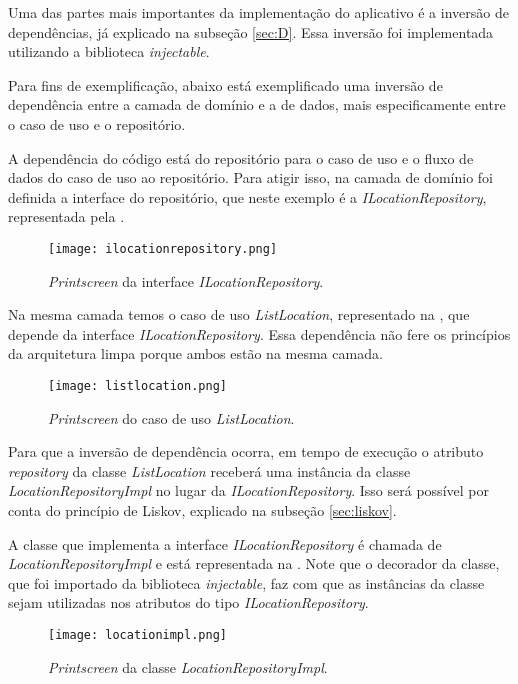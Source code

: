 Uma das partes mais importantes da implementação do aplicativo é a inversão de dependências, já explicado na subseção \ref{sec:D}. Essa inversão foi implementada utilizando a biblioteca \textit{injectable}.

Para fins de exemplificação, abaixo está exemplificado uma inversão de dependência entre a camada de domínio e a de dados, mais especificamente entre o caso de uso e o repositório.

A dependência do código está do repositório para o caso de uso e o fluxo de dados do caso de uso ao repositório. Para atigir isso, na camada de domínio foi definida a interface do repositório, que neste exemplo é a \textit{ILocationRepository}, representada pela .

\begin{figure}[!htb]
  \centering
  \texttt{[image: ilocationrepository.png]}
  \caption{\textit{Printscreen} da interface \textit{ILocationRepository}.}
  \label{fig:locationrepository}
\end{figure}

Na mesma camada temos o caso de uso \textit{ListLocation}, representado na , que depende da interface \textit{ILocationRepository}. Essa dependência não fere os princípios da arquitetura limpa porque ambos estão na mesma camada.

\begin{figure}[!htb]
  \centering
  \texttt{[image: listlocation.png]}
  \caption{\textit{Printscreen} do caso de uso \textit{ListLocation}.}
  \label{fig:listlocation}
\end{figure}

Para que a inversão de dependência ocorra, em tempo de execução o atributo \textit{repository} da classe \textit{ListLocation} receberá uma instância da classe \textit{LocationRepositoryImpl} no lugar da \textit{ILocationRepository}. Isso será possível por conta do princípio de Liskov, explicado na subseção \ref{sec:liskov}.

A classe que implementa a interface \textit{ILocationRepository} é chamada de \textit{LocationRepositoryImpl} e está representada na . Note que o decorador da classe, que foi importado da biblioteca \textit{injectable}, faz com que as instâncias da classe sejam utilizadas nos atributos do tipo \textit{ILocationRepository}.

\begin{figure}[!htb]
  \centering
  \texttt{[image: locationimpl.png]}
  \caption{\textit{Printscreen} da classe \textit{LocationRepositoryImpl}.}
  \label{fig:locationimpl}
\end{figure}

